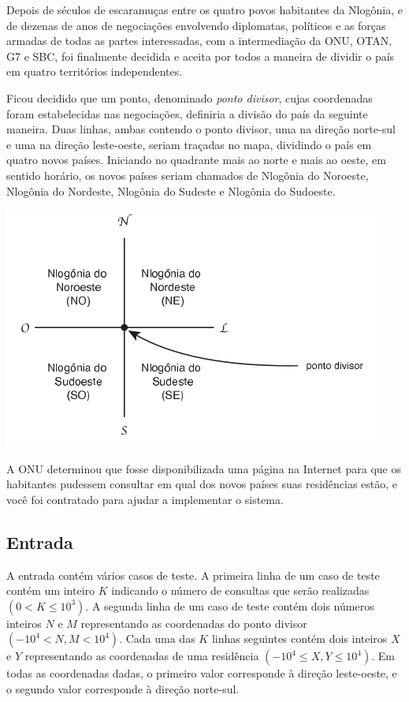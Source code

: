 Depois de séculos de escaramuças entre os quatro povos habitantes da Nlogônia, e
de dezenas de anos de negociações envolvendo diplomatas, políticos e as forças
armadas de todas as partes interessadas, com a intermediação da ONU, OTAN, G7 e
SBC, foi finalmente decidida e aceita por todos a maneira de dividir o país em
quatro territórios independentes.

Ficou decidido que um ponto, denominado \textit{ponto divisor}, cujas
coordenadas foram estabelecidas nas negociações, definiria a divisão do país da
seguinte maneira.  Duas linhas, ambas contendo o ponto divisor, uma na direção
norte-sul e uma na direção leste-oeste, seriam traçadas no mapa, dividindo o
país em quatro novos países. Iniciando no quadrante mais ao norte e mais ao
oeste, em sentido horário, os novos países seriam chamados de Nlogônia do
Noroeste, Nlogônia do Nordeste, Nlogônia do Sudeste e Nlogônia do Sudoeste.

\begin{center}
\includegraphics[scale=0.6]{problems/nlogonia/imagens/nlogonia.png}
\end{center}

A ONU determinou que fosse disponibilizada uma página na Internet para que os
habitantes pudessem consultar em qual dos novos países suas residências estão, e
você foi contratado para ajudar a implementar o sistema.

\subsection*{Entrada}

A entrada contém vários casos de teste. A primeira linha de um caso de teste
contém um inteiro $K$ indicando o número de consultas que serão realizadas
$(0 < K \leq 10^3)$. A segunda linha de um caso de teste contém dois números
inteiros $N$ e $M$ representando as coordenadas do ponto divisor
$(-10^4 < N, M < 10^4)$. Cada uma das $K$ linhas seguintes contém dois inteiros
$X$ e $Y$ representando as coordenadas de uma residência $(-10^4 \leq X, Y \leq 10^4)$.
Em todas as coordenadas dadas, o primeiro valor corresponde à direção leste-oeste, e o
segundo valor corresponde à direção norte-sul.

